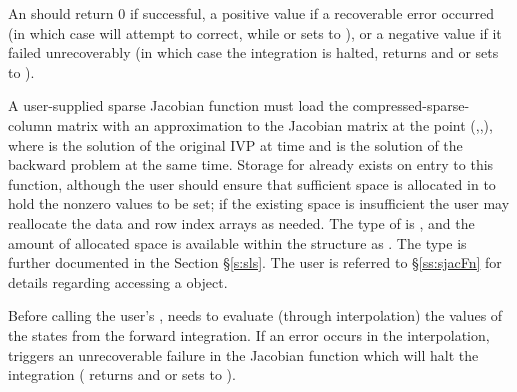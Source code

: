 {
  An  should return 0 if successful, a positive
  value if a recoverable error occurred (in which case {\idas} will
  attempt to correct, while {\idaklu} or {\idasuperlumt} sets
   to ), or a negative value
  if it failed unrecoverably (in which case the integration is halted,
   returns  and {\idaklu} or
  {\idasuperlumt} sets  to ).
}
{
  A user-supplied sparse Jacobian function must load the
  compressed-sparse-column matrix  with an approximation to
  the Jacobian matrix at the point (,,), where
   is the solution of the original IVP at time  and
   is the solution of the backward problem at the same time.
  Storage for  already exists on entry to this function,
  although the user should ensure that sufficient space is allocated
  in  to hold the nonzero values to be set; if the existing
  space is insufficient the user may reallocate the data and row index
  arrays as needed.  The type of  is , and the
  amount of allocated space is available within the 
  structure as .  The  type is further documented
  in the Section \S\ref{s:sls}.  The user is referred to
  \S\ref{ss:sjacFn} for details regarding accessing a 
  object.

  {\warn}Before calling the user's , {\idas}
  needs to evaluate (through interpolation) the values of the states
  from the forward integration.  If an error occurs in the
  interpolation, {\idas} triggers an unrecoverable failure in the
  Jacobian function which will halt the integration (
  returns  and {\idaklu} or {\idasuperlumt} sets
   to ).
}

